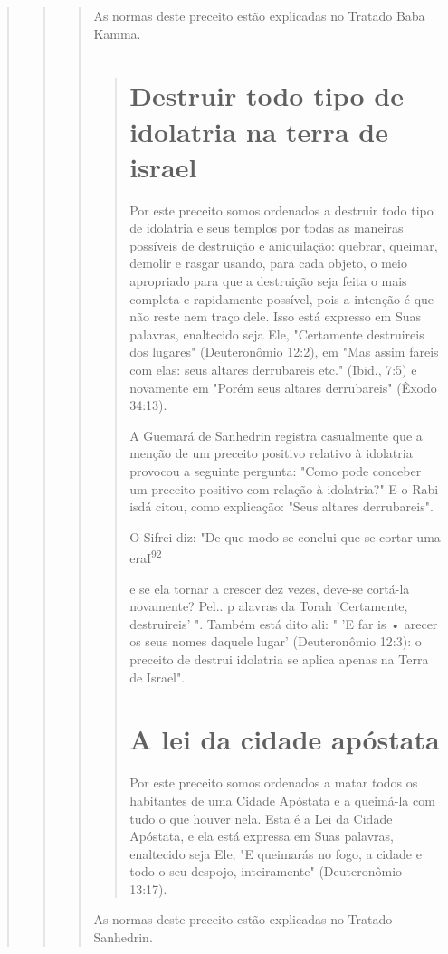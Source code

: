 \begin{quote}
\begin{quote}
\begin{quote}
As normas deste preceito estão explicadas no Tratado Baba Kamma.

\begin{quote}
\section{Destruir todo tipo de idolatria na terra de israel}

Por este preceito somos ordenados a destruir todo tipo de idolatria e
seus templos por todas as maneiras possíveis de destruição e
aniquilação: que­brar, queimar, demolir e rasgar usando, para cada
objeto, o meio apropriado para que a destruição seja feita o mais
completa e rapidamente possível, pois a intenção é que não reste nem
traço dele. Isso está expresso em Suas palavras, enaltecido seja Ele,
"Certamente destruireis dos lugares" (Deuteronômio 12:2), em "Mas assim
fareis com elas: seus altares derrubareis etc." (Ibid., 7:5) e
nova­mente em "Porém seus altares derrubareis" (Êxodo 34:13).

A Guemará de Sanhedrin registra casualmente que a menção de um preceito
positivo relativo à idolatria provocou a seguinte pergunta: "Como pode
conceber um preceito positivo com relação à idolatria?" E o Rabi isdá
citou, como explicação: "Seus altares derrubareis".

O Sifrei diz: "De que modo se conclui que se cortar uma
eraI\textsuperscript{92}

e se ela tornar a crescer dez vezes, deve-se cortá-la novamente? Pel.. p
alavras da Torah 'Certamente, destruireis' ". Também está dito ali: " 'E
far is • arecer os seus nomes daquele lugar' (Deuteronômio 12:3): o
preceito de destrui ido­latria se aplica apenas na Terra de Israel".

\section{A lei da cidade apóstata}

Por este preceito somos ordenados a matar todos os habitantes de uma
Cidade Apóstata e a queimá-la com tudo o que houver nela. Esta é a Lei
da Cidade Apóstata, e ela está expressa em Suas palavras, enaltecido
seja Ele, "E queimarás no fogo, a cidade e todo o seu despojo,
inteiramente" (Deuteronômio 13:17).
\end{quote}

As normas deste preceito estão explicadas no Tratado Sanhedrin.

\begin{quote}

\end{quote}
\end{quote}
\end{quote}
\end{quote}
